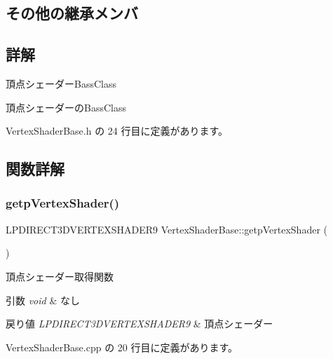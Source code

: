 \subsection*{その他の継承メンバ}


\subsection{詳解}
頂点シェーダー\+Bass\+Class 

頂点シェーダーの\+Bass\+Class 

 Vertex\+Shader\+Base.\+h の 24 行目に定義があります。



\subsection{関数詳解}
\mbox{\label{class_vertex_shader_base_a2111b20156419548afe14132651d5e21}} 
\subsubsection{\texorpdfstring{getp\+Vertex\+Shader()}{getpVertexShader()}}
{\footnotesize\ttfamily L\+P\+D\+I\+R\+E\+C\+T3\+D\+V\+E\+R\+T\+E\+X\+S\+H\+A\+D\+E\+R9 Vertex\+Shader\+Base\+::getp\+Vertex\+Shader (\begin{DoxyParamCaption}{ }\end{DoxyParamCaption})}



頂点シェーダー取得関数 


\begin{DoxyParams}{引数}
{\em void} & なし \\
\hline
\end{DoxyParams}

\begin{DoxyRetVals}{戻り値}
{\em L\+P\+D\+I\+R\+E\+C\+T3\+D\+V\+E\+R\+T\+E\+X\+S\+H\+A\+D\+E\+R9} & 頂点シェーダー \\
\hline
\end{DoxyRetVals}


 Vertex\+Shader\+Base.\+cpp の 20 行目に定義があります。

\mbox{\label{class_vertex_shader_base_a42ff1e32a2c231f77d0ba0e6a8312e63}} 
